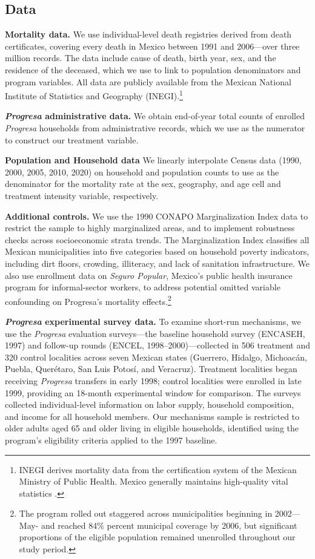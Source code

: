 \documentclass[12pt]{article}
\begin{document}
\subsection{Data}\label{s:sources}

\p \textbf{Mortality data.} We use individual-level death registries derived from death certificates, covering every death in Mexico between 1991 and 2006—over three million records. The data include cause of death, birth year, sex, and the residence of the deceased, which we use to link to population denominators and program variables. All data are publicly available from the Mexican National Institute of Statistics and Geography (INEGI).\footnote{INEGI derives mortality data from the certification system of the Mexican Ministry of Public Health. Mexico generally maintains high-quality vital statistics \citep{mahapatra2007civil, mikkelsen2015global}.}

\p \textbf{\textit{Progresa} administrative data.} We obtain end-of-year total counts of enrolled \textit{Progresa} households from administrative records, which we use as the numerator to construct our treatment variable.

\p \textbf{Population and Household data} We linearly interpolate Census data (1990, 2000, 2005, 2010, 2020) on household and population counts to use as the denominator for the mortality rate at the sex, geography, and age cell and treatment intensity variable, respectively.


\p \textbf{Additional controls.} We use the 1990 CONAPO Marginalization Index data to restrict the sample to highly marginalized areas, and to implement robustness checks across socioeconomic strata trends. The Marginalization Index classifies all Mexican municipalities into five categories based on household poverty indicators, including dirt floors, crowding, illiteracy, and lack of sanitation  
infrastructure. We also use enrollment data on \textit{Seguro Popular}, Mexico's public health insurance program for informal-sector workers, to address potential omitted variable confounding on Progresa's mortality effects.\footnote{The program rolled out staggered across municipalities beginning in 2002—May- and reached 84\% percent municipal coverage by 2006, but significant proportions of the eligible population remained unenrolled throughout our study period.}

\p \textbf{\textit{Progresa} experimental survey data.} To examine short-run mechanisms, we use the \textit{Progresa} evaluation surveys—the baseline household survey (ENCASEH, 1997) and follow-up rounds (ENCEL, 1998--2000)—collected in 506 treatment and 320 control localities across seven Mexican states (Guerrero, Hidalgo, Michoacán, Puebla, Querétaro, San Luis Potosí, and Veracruz). Treatment localities began receiving \textit{Progresa} transfers in early 1998; control localities were enrolled in late 1999, providing an 18-month experimental window for comparison. The surveys collected individual-level information on labor supply, household composition, and income for all household members. Our mechanisms sample is restricted to older adults aged 65 and older living in eligible households, identified using the program's eligibility criteria applied to the 1997 baseline. 
\end{document}
